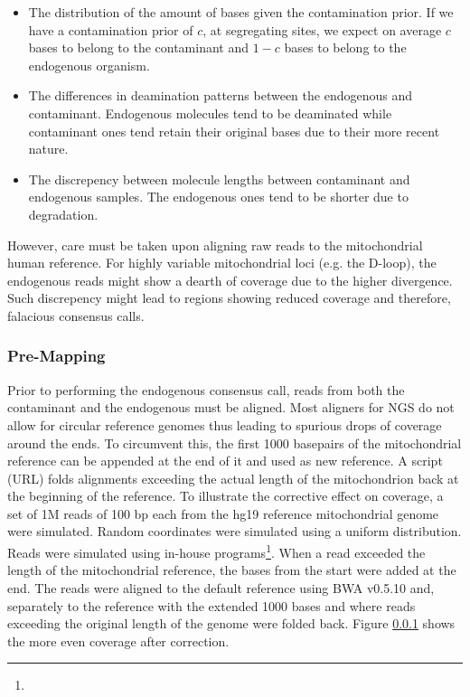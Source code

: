\documentclass[a4paper,12pt]{article}
\begin{document}
\begin{itemize}
\item The distribution of the amount of bases given the contamination prior. If we have a contamination prior of $c$, at segregating sites, we expect on average $c$ bases to belong to the contaminant and $1-c$ bases to belong to the endogenous organism.
\item The differences in deamination patterns between the endogenous and contaminant. Endogenous molecules tend to be deaminated while contaminant ones tend retain their original bases due to their more recent nature. 
\item The discrepency between molecule lengths between contaminant and endogenous samples. The endogenous ones tend to be shorter due to degradation.
\end{itemize}

However, care must be taken upon aligning raw reads to the mitochondrial human reference. For highly variable mitochondrial loci (e.g. the D-loop), the endogenous reads might show a dearth of coverage due to the higher divergence. Such discrepency might lead to regions showing reduced coverage and therefore, falacious consensus calls.

\subsubsection{Pre-Mapping}


Prior to performing the endogenous consensus call, reads from both the contaminant and the endogenous must be aligned. Most aligners for NGS do not allow for circular reference genomes thus leading to spurious drops of coverage around the ends. To circumvent this, the first 1000 basepairs  of the mitochondrial reference can be appended at the end of it and used as new reference. A script (URL) folds alignments exceeding the actual length of the mitochondrion back at the beginning of the reference. To illustrate the corrective effect on coverage, a set of 1M reads of 100 bp each from the hg19 reference mitochondrial genome were simulated. Random coordinates were simulated using a uniform distribution. Reads were simulated using in-house programs\footnote{}. When a read exceeded the length of the mitochondrial reference, the bases from the start were added at the end. The reads were aligned to the default reference using BWA v0.5.10\cite{} and, separately to the reference with the extended 1000 bases and where reads exceeding the original length of the genome were folded back. Figure \ref{} shows the more even coverage after correction.
\end{document}

